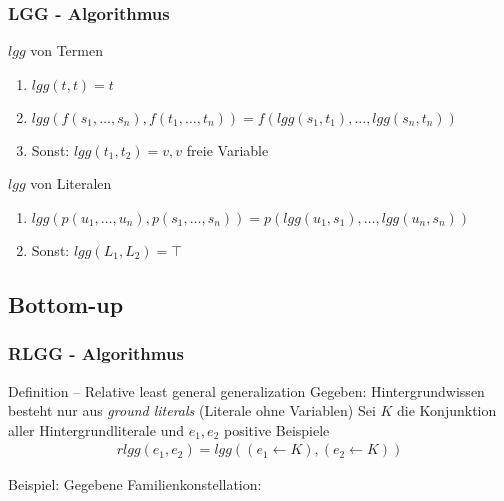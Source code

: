 \begin{frame}
\frametitle{LGG - Algorithmus}
	\begin{block}{$lgg$ von Termen}
		\begin{enumerate}
			\item $lgg(t,t) = t$\\
			\item $lgg(f(s_1, \ldots, s_n), f(t_1, \ldots, t_n)) = f(lgg(s_1, t_1), \ldots, lgg(s_n, t_n))$
			\item Sonst: $lgg(t_1, t_2) = v , v$ freie Variable
		\end{enumerate}
	\end{block}
	\begin{block}{$lgg$ von Literalen}
	\begin{enumerate}
		\item $lgg(p(u_1, \ldots, u_n), p(s_1, \ldots, s_n)) = p(lgg(u_1, s_1), \ldots, lgg(u_n, s_n))$\\
		\item Sonst: $lgg(L_1, L_2) = \top$
	\end{enumerate}
	\end{block}
\end{frame}


\subsection{Bottom-up}
\begin{frame}
\frametitle{RLGG - Algorithmus}
\begin{block}{Definition -- Relative least general generalization}
	Gegeben: Hintergrundwissen besteht nur aus \textit{ground literals} (Literale ohne Variablen)
	Sei $K$ die Konjunktion aller Hintergrundliterale und $e_1, e_2$ positive Beispiele
	\begin{align*}
		rlgg(e_1, e_2) = lgg((e_1 \leftarrow K), (e_2 \leftarrow K))
	\end{align*}
\end{block}

Beispiel: Gegebene Familienkonstellation:
\end{frame}


